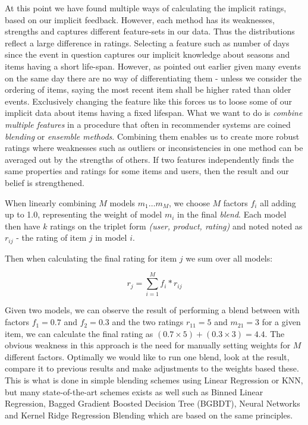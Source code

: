 At this point we have found multiple ways of calculating the implicit ratings,
based on our implicit feedback. However, each method has its weaknesses,
strengths and captures different feature-sets in our data. Thus the
distributions reflect a large difference in ratings. Selecting a feature such
as number of days since the event in question captures our implicit knowledge
about seasons and items having a short life-span. However, as pointed out
earlier given many events on the same day there are no way of differentiating
them - unless we consider the ordering of items, saying the most recent item
shall be higher rated than older events. Exclusively changing the
feature like this forces us to loose some of our implicit data about items
having a fixed lifespan. What we want to do is \textit{combine multiple
features} in a procedure that often in recommender systems are coined
\textit{blending} or \textit{ensemble methods}. Combining them enables us to
create more robust ratings where weaknesses such as outliers or inconsistencies
in one method can be averaged out by the strengths of others. If two features
independently finds the same properties and ratings for some items and users,
then the result and our belief is strengthened.

When linearly combining $M$ models $m_1 \dots m_M$, we choose $M$ factors $f_i$
all adding up to 1.0, representing the weight of model $m_{i}$ in the final
\textit{blend}. Each model then have $k$ ratings on the triplet form
\textit{(user, product, rating)} and noted noted as $r_{ij}$ - the rating of
item $j$ in model $i$.

Then when calculating the final rating for item $j$ we sum over all
models:

\begin{equation}
  r_j = \sum _{i=1}^{M} f_{i} * r_{ij}
\end{equation}

Given two models, we can observe the result of performing a blend between with
factors $f_1 = 0.7$ and $f_2 = 0.3$ and the two ratings $r_{11} = 5$ and
$m_{21} = 3$ for a given item, we can calculate the final rating as $(0.7
\times 5) + (0.3 \times 3) = 4.4$. The obvious weakness in this approach is the
need for manually setting weights for $M$ different factors. Optimally we would
like to run one blend, look at the result, compare it to previous results and
make adjustments to the weights based these. This is what is done in simple
blending schemes using Linear Regression or KNN, but many state-of-the-art
schemes exists as well such as Binned Linear Regression, Bagged Gradient
Boosted Decision Tree (BGBDT), Neural Networks and Kernel Ridge Regression
Blending \cite{jahrer2010combining} \cite{toscher2009bigchaos} which are based
on the same principles.

